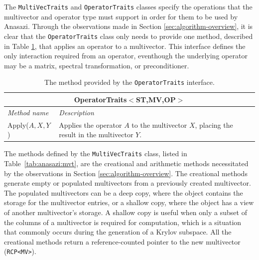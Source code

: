 \documentclass[acmtoms]{acmtrans2m}
\newcounter{algorithm}
\newcommand{\aspace}[1]{\texttt{#1}}
\begin{document}
The \aspace{MultiVecTraits} and \aspace{OperatorTraits} classes specify
the operations that the multivector and operator type must support in order for them to be
used by Anasazi. Through the observations made in Section \ref{sec:algorithm-overview}, 
it is clear that the \aspace{OperatorTraits} class only needs to provide one method,
described in Table \ref{tab:anasazi:opt}, that applies an operator to a multivector.  
This interface defines the only interaction required from an operator, eventhough
the underlying operator may be a matrix, 
spectral transformation, or preconditioner.
\begin{table}[bth]
\begin{center}
  \caption{The method provided by the \aspace{OperatorTraits} interface.}
\label{tab:anasazi:opt}
\begin{tabular}{| p{4cm} | p{8cm} |}
\hline
\multicolumn{2}{|c|}{\textbf{OperatorTraits$<$ST,MV,OP$>$}} \\\hline
\emph{Method name} & \emph{Description} \\\hline
Apply($A,X,Y$) & Applies the operator $A$ to the multivector $X$, placing the
result in the multivector $Y$. \\
\hline
\end{tabular}
\end{center}
\end{table}

The methods defined by the \aspace{MultiVecTraits} class, listed in
Table~\ref{tab:anasazi:mvt}, are the creational and arithmetic methods necessitated
by the observations in Section \ref{sec:algorithm-overview}.
The creational methods generate empty or populated multivectors from a previously
created multivector. The populated multivectors can be 
a deep copy, where the object contains the storage for the multivector entries, or a shallow copy, 
where the object has a view of another multivector's storage.
A shallow copy is useful when only a
subset of the columns of a multivector is required for computation, which is a situation that 
commonly occurs during the generation of a Krylov subspace. All the creational methods return
a reference-counted pointer \cite{Detlefs:1992:GCR,Teuchos-RCP} to the new multivector (\aspace{RCP<MV>}). 

\end{document}
